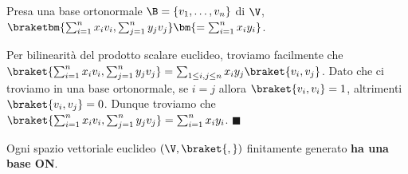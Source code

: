 \documentclass[11pt, a4paper, titlepage, oneside]{scrbook}
\begin{document}
\begin{Osservazione}[]
\label{oss-base-ortonormale}
Presa una base ortonormale $\B = \{v_1, \ldots, v_n\}$ di $\V$, $\braketbm{\sum_{i = 1}^n x_i v_i, \sum_{j = 1}^n y_j v_j} \bm{= \sum_{i = 1}^n x_i y_i}$.
\end{Osservazione}

\Dimostrazione \nopagebreak

Per bilinearità del prodotto scalare euclideo, troviamo facilmente che $\braket{\sum_{i = 1}^n x_i v_i, \sum_{j = 1}^n y_j v_j} = \sum_{1 \leq i,j\leq n} x_i y_j \braket{v_i, v_j}$. Dato che ci troviamo in una base ortonormale, se $i = j$ allora $\braket{v_i,v_i} = 1$, altrimenti $\braket{v_i,v_j} = 0$. Dunque troviamo che $\braket{\sum_{i = 1}^n x_i v_i, \sum_{j = 1}^n y_j v_j} = \sum_{i = 1}^n x_i y_i$. $\blacksquare$

\begin{Proposizione}[]
\label{propos-base-ON}
Ogni spazio vettoriale euclideo $(\V, \braket{,})$ finitamente generato \textbf{ha una base ON}.
\end{Proposizione}

\Dimostrazione \nopagebreak
\end{document}
